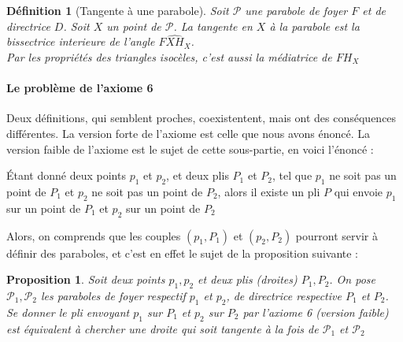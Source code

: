 \documentclass[a4paper,12pt,french]{report}
\newtheorem{proposition}{Proposition}[section]
\newtheorem{definition}{Définition}[section]
\begin{document}
			\begin{definition}[Tangente à une parabole]
				Soit $\mathcal{P}$ une parabole de foyer $F$ et de directrice $D$. Soit $X$ un point de $\mathcal{P}$. La tangente en $X$ à la parabole est la bissectrice interieure de l'angle $\widehat{FXH_{X}}$.\\
				Par les propriétés des triangles isocèles, c'est aussi la médiatrice de $FH_{X}$
			\end{definition}
			
			\paragraph{Le problème de l'axiome 6}
			Deux définitions, qui semblent proches, coexistentent, mais ont des conséquences différentes. La version forte de l'axiome est celle que nous avons énoncé. La version faible de l'axiome est le sujet de cette sous-partie, en voici l'énoncé :
			
			\begin{axiome}
			Étant donné deux points $p_{1}$ et $p_{2}$, et deux plis $P_{1}$ et $P_{2}$, tel que $p_{1}$ ne soit pas un point de $P_{1}$ et $p_{2}$ ne soit pas un point de $P_{2}$, alors il existe un pli $P$ qui envoie $p_{1}$ sur un point de $P_{1}$ et $p_{2}$ sur un point de $P_{2}$
			\end{axiome}
			
			Alors, on comprends que les couples $(p_{1},P_{1})$ et $(p_{2},P_{2})$ pourront servir à définir des paraboles, et c'est en effet le sujet de la proposition suivante : 
			
			\begin{proposition}
				Soit deux points $p_{1},p_{2}$ et deux plis (droites) $P_{1},P_{2}$. On pose $\mathcal{P}_{1},\mathcal{P}_{2}$ les paraboles de foyer respectif $p_{1}$ et $p_{2}$, de directrice respective $P_{1}$ et $P_{2}$. Se donner le pli envoyant $p_{1}$ sur $P_{1}$ et $p_{2}$ sur $P_{2}$ par l'axiome 6 (version faible) est équivalent à chercher une droite qui soit tangente à la fois de $\mathcal{P}_{1}$ et $\mathcal{P}_{2}$
			\end{proposition}
			
\end{document}
